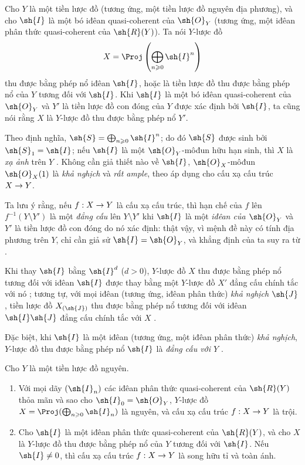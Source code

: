 \documentclass[oneside,10pt]{amsart}
\makeatletter
\renewcommand{\geq}{\geqslant}
\newcommand{\ega@arrow}[2]{\mathchoice{#1}{#2}{#2}{#2}}
\renewcommand{\to}{\ega@arrow{\longrightarrow}{\rightarrow}}
\newcommand{\oldpage}[2][]{\marginnote{\normalfont\footnotesize\textbf{#1}~|~#2}\ignorespaces}
\let\EGAOriginalLabel\label
\renewcommand{\label}[1]{\phantomsection\EGAOriginalLabel{#1}}
\makeatother
\begin{document}
\begin{definition}[8.1.3]
\label{II.8.1.3}
Cho $Y$ là một tiền lược đồ (tương ứng, một tiền lược đồ nguyên địa phương), và cho $\sh{I}$ là một bó iđêan quasi-coherent của $\sh{O}_Y$ (tương ứng, một iđêan phân thức quasi-coherent của $\sh{R}(Y)$).
Ta nói $Y$-lược đồ
\[
  X=\Proj\left(\bigoplus_{n\geq0}\sh{I}^n\right)
\]
thu được bằng phép nổ iđêan $\sh{I}$, hoặc là tiền lược đồ thu được bằng phép nổ của $Y$ tương đối với $\sh{I}$.
Khi $\sh{I}$ là một bó iđêan quasi-coherent của $\sh{O}_Y$ và $Y'$ là tiền lược đồ con đóng của $Y$ được xác định bởi $\sh{I}$, ta cũng nói rằng $X$ là $Y$-lược đồ thu được bằng phép nổ $Y'$.
\end{definition}

Theo định nghĩa, $\sh{S}=\bigoplus_{n\geq0}\sh{I}^n$; do đó $\sh{S}$ được sinh bởi $\sh{S}_1=\sh{I}$;
nếu $\sh{I}$ là một $\sh{O}_Y$-môđun hữu hạn sinh, thì $X$ là \emph{xạ ảnh} trên $Y$ .
Không cần giả thiết nào về $\sh{I}$, $\sh{O}_X$-môđun $\sh{O}_X(1)$ là \emph{khả nghịch}  và \emph{rất ample}, theo  áp dụng cho cấu xạ cấu trúc $X\to Y$.

Ta lưu ý rằng, nếu $f:X\to Y$ là cấu xạ cấu trúc, thì hạn chế của $f$ lên $f^{-1}(Y\setminus Y')$ là một \emph{đẳng cấu} lên $Y\setminus Y'$ khi $\sh{I}$ là một \emph{iđêan của $\sh{O}_Y$} và $Y'$ là tiền lược đồ con đóng do nó xác định:
thật vậy, vì mệnh đề này có tính địa phương trên $Y$, chỉ cần giả sử $\sh{I}=\sh{O}_Y$, và khẳng định của ta suy ra từ .

Khi thay $\sh{I}$ bằng $\sh{I}^d$ ($d>0$), $Y$-lược đồ $X$ thu được bằng phép nổ tương đối với iđêan $\sh{I}$ được thay bằng một $Y$-lược đồ $X'$ đẳng cấu chính tắc với nó ;
tương tự, với mọi iđêan (tương ứng, iđêan phân thức) \emph{khả nghịch} $\sh{J}$, tiền lược đồ $X_{(\sh{J})}$ thu được bằng phép nổ tương đối với iđêan $\sh{I}\sh{J}$ đẳng cấu chính tắc với $X$ .

Đặc biệt, khi $\sh{I}$ là một iđêan (tương ứng, một iđêan phân thức) \emph{khả nghịch}, $Y$-lược đồ thu được bằng phép nổ $\sh{I}$ là \emph{đẳng cấu với $Y$} .

\begin{proposition}[8.1.4]
\label{II.8.1.4}
Cho $Y$ là một tiền lược đồ nguyên.
\begin{enumerate}
    \item[\rm{(i)}] Với mọi dãy $(\sh{I}_n)$ các iđêan phân thức quasi-coherent của $\sh{R}(Y)$ thỏa mãn 
\oldpage[II]{154}
        và sao cho $\sh{I}_0=\sh{O}_Y$, $Y$-lược đồ $X=\Proj(\bigoplus_{n\geq0}\sh{I}_n)$ là nguyên, và cấu xạ cấu trúc $f:X\to Y$ là trội.
    \item[\rm{(ii)}] Cho $\sh{I}$ là một iđêan phân thức quasi-coherent của $\sh{R}(Y)$, và cho $X$ là $Y$-lược đồ thu được bằng phép nổ của $Y$ tương đối với $\sh{I}$.
        Nếu $\sh{I}\neq0$, thì cấu xạ cấu trúc $f:X\to Y$ là song hữu tỉ và toàn ánh.
\end{enumerate}
\end{proposition}
\end{document}
